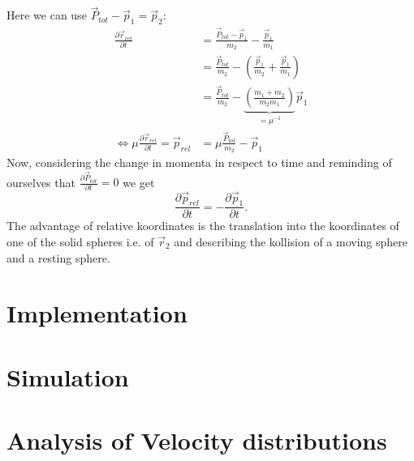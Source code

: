 \documentclass{article}
\begin{document}
    Here we can use $\vec{P}_{tot}-\vec{p}_1=\vec{p}_2$:
    \begin{align*}
        \frac{\partial \vec{r}_{rel}}{\partial t} &= \frac{\vec{P}_{tot}-\vec{p}_1}{m_2} - \frac{\vec{p}_1}{m_1} \\
        &= \frac{\vec{P}_{tot}}{m_2} - \left(\frac{\vec{p}_1}{m_2}+\frac{\vec{p}_1}{m_1}\right) \\
        &= \frac{\vec{P}_{tot}}{m_2} - \underset{=\mu^{-1}}{\underbrace{\left(\frac{m_1+m_2}{m_2m_1}\right)}}  \vec{p}_1 \\
        \Leftrightarrow \mu \frac{\partial \vec{r}_{rel}}{\partial t}= \vec{p}_{rel} &= \mu \frac{\vec{P}_{tot}}{m_2} - \vec{p}_1
    \end{align*} 
    Now, considering the change in momenta in respect to time and reminding of ourselves that $\frac{\partial \vec{P}_{tot}}{\partial t}=0$ we get
    \begin{equation*}
        \frac{\partial \vec{p}_{rel}}{\partial t} =-\frac{\partial \vec{p}_1}{\partial t}.
    \end{equation*}
    The advantage of relative koordinates is the translation into the koordinates of one of the solid spheres i.e. of $\vec{r}_2$ and describing the kollision of a moving sphere and a resting sphere.

\section{Implementation}
    

\section{Simulation}


\section{Analysis of Velocity distributions}
\end{document}
